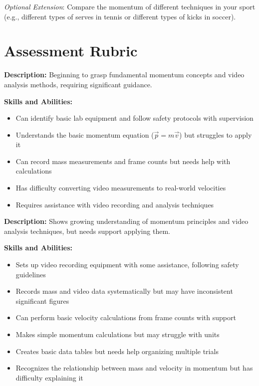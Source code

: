 \documentclass[12pt]{article}
\begin{document}
\textit{Optional Extension}: Compare the momentum of different techniques in your sport (e.g., different types of serves in tennis or different types of kicks in soccer).
\section*{Assessment Rubric}

\begin{tcolorbox}[colback=conceptgreen!10,colframe=conceptgreen,title=\textbf{Emerging}]
\textbf{Description:} Beginning to grasp fundamental momentum concepts and video analysis methods, requiring significant guidance.

\textbf{Skills and Abilities:}
\begin{itemize}
\item Can identify basic lab equipment and follow safety protocols with supervision
\item Understands the basic momentum equation ($\vec{p} = m\vec{v}$) but struggles to apply it
\item Can record mass measurements and frame counts but needs help with calculations
\item Has difficulty converting video measurements to real-world velocities
\item Requires assistance with video recording and analysis techniques
\end{itemize}
\end{tcolorbox}

\begin{tcolorbox}[colback=conceptgreen!10,colframe=conceptgreen,title=\textbf{Developing}]
\textbf{Description:} Shows growing understanding of momentum principles and video analysis techniques, but needs support applying them.

\textbf{Skills and Abilities:}
\begin{itemize}
\item Sets up video recording equipment with some assistance, following safety guidelines
\item Records mass and video data systematically but may have inconsistent significant figures
\item Can perform basic velocity calculations from frame counts with support
\item Makes simple momentum calculations but may struggle with units
\item Creates basic data tables but needs help organizing multiple trials
\item Recognizes the relationship between mass and velocity in momentum but has difficulty explaining it
\end{itemize}
\end{tcolorbox}
\end{document}
